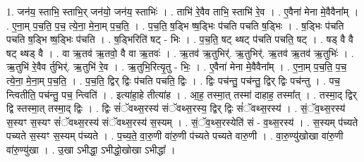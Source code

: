 \documentclass[17pt]{extarticle}
\begin{document}
1. जन॑य॒ स्ताभि॒ स्ताभि॒र् जन॑यो॒ जन॑य॒ स्ताभिः॑ । . ताभि॑ रे॒वैव ताभि॒ स्ताभि॑ रे॒व । . ए॒वैना॑ मेना मे॒वैवैना᳚म् । . ए॒ना॒म् प॒च॒ति॒ प॒च॒ त्ये॒ना॒ मे॒ना॒म् प॒च॒ति॒ । . प॒च॒ति॒ ष॒ड्भि ष्ष॒ड्भिः प॑चति पचति ष॒ड्भिः । . ष॒ड्भिः प॑चति पचति ष॒ड्भि ष्ष॒ड्भिः प॑चति । . ष॒ड्भिरिति॑ षट् - भिः । . प॒च॒ति॒ षट् थ्षट् प॑चति पचति॒ षट् । . षड् वै वै षट् थ्षड् वै । . वा ऋ॒तव॑ ऋ॒तवो॒ वै वा ऋ॒तवः॑ । . ऋ॒तव॑ ऋ॒तुभिर्॑. ऋ॒तुभिर्॑. ऋ॒तव॑ ऋ॒तव॑ ऋ॒तुभिः॑ । . ऋ॒तुभि॑ रे॒वैव र्तुभिर्॑. ऋ॒तुभि॑ रे॒व । . ऋ॒तुभि॒रित्यृ॒तु - भिः॒ । . ए॒वैना॑ मेना मे॒वैवैना᳚म् । . ए॒ना॒म् प॒च॒ति॒ प॒च॒ त्ये॒ना॒ मे॒ना॒म् प॒च॒ति॒ । . प॒च॒ति॒ द्विर् द्विः प॑चति पचति॒ द्विः । . द्विः पच॑न्तु॒ पच॑न्तु॒ द्विर् द्विः पच॑न्तु । . पच॒ न्त्वितीति॒ पच॑न्तु॒ पच॒ न्त्विति॑ । . इत्या॑हा॒हे तीत्या॑ह । . आ॒ह॒ तस्मा॒त् तस्मा॑ दाहाह॒ तस्मा᳚त् । . तस्मा॒द् द्विर् द्वि स्तस्मा॒त् तस्मा॒द् द्विः । . द्विः सं॑ॅवथ्स॒रस्य॑ संॅवथ्स॒रस्य॒ द्विर् द्विः सं॑ॅवथ्स॒रस्य॑ । . सं॒ॅव॒थ्स॒रस्य॑ स॒स्यꣳ स॒स्यꣳ सं॑ॅवथ्स॒रस्य॑ संॅवथ्स॒रस्य॑ स॒स्यम् । . सं॒ॅव॒थ्स॒रस्येति॑ सं - व॒थ्स॒रस्य॑ । . स॒स्यम् प॑च्यते पच्यते स॒स्यꣳ स॒स्यम् प॑च्यते । . प॒च्य॒ते॒ वा॒रु॒णी वा॑रु॒णी प॑च्यते पच्यते वारु॒णी । . वा॒रु॒ण्यु॑खोखा वा॑रु॒णी वा॑रु॒ण्यु॑खा । . उ॒खा ऽभीद्धा॒ ऽभीद्धो॒खोखा ऽभीद्धा᳚ । \newline
\end{document}
